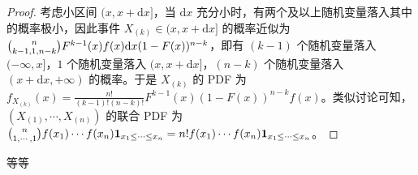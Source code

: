 \documentclass[../main.tex]{subfiles}
\begin{document}
\begin{proof}
    考虑小区间 $(x,x+\mathrm dx]$，当 $\mathrm dx$ 充分小时，有两个及以上随机变量落入其中的概率极小，因此事件 $X_{(k)}\in(x,x+\mathrm dx]$ 的概率近似为 $\tbinom{n}{k-1,1,n-k}F^{k-1}(x)f(x)\mathrm dx(1-F(x))^{n-k}$，即有 $(k-1)$ 个随机变量落入 $(-\infty,x]$，$1$ 个随机变量落入 $(x,x+\mathrm dx]$，$(n-k)$ 个随机变量落入 $(x+\mathrm dx,+\infty)$ 的概率。于是 $X_{(k)}$ 的 PDF 为 $f_{X_{(k)}}(x)=\frac{n!}{(k-1)!(n-k)!}F^{k-1}(x)(1-F(x))^{n-k}f(x)$。类似讨论可知，$(X_{(1)},\cdots,X_{(n)})$ 的联合 PDF 为 $\tbinom{n}{1,\cdots,1}f(x_1)\cdots f(x_n)\mathbf 1_{x_1\leq\cdots\leq x_n}=n!f(x_1)\cdots f(x_n)\mathbf 1_{x_1\leq\cdots\leq x_n}$。
\end{proof}

\begin{theorem}\label{thm:6.4.5}
    等等
\end{theorem}
\end{document}
